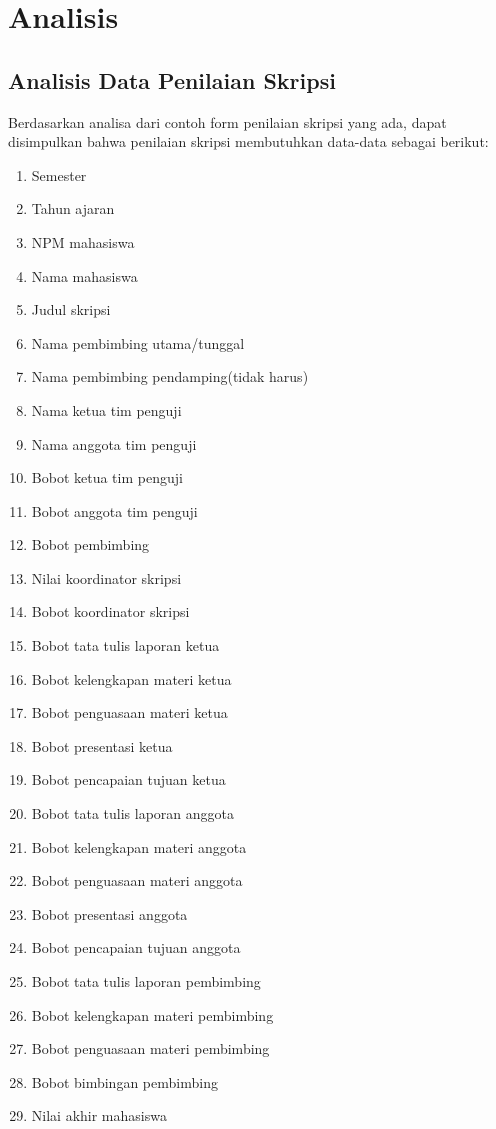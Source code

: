 \chapter{Analisis}
\label{chap: analisis}

\section{Analisis Data Penilaian Skripsi}
\label{sec: analisisData}

	Berdasarkan analisa dari contoh form penilaian skripsi yang ada, dapat disimpulkan bahwa penilaian skripsi membutuhkan data-data sebagai berikut:
		
		\begin{enumerate}
			\item Semester
			\item Tahun ajaran
			\item NPM mahasiswa 
			\item Nama mahasiswa
			\item Judul skripsi
			\item Nama pembimbing utama/tunggal
			\item Nama pembimbing pendamping(tidak harus)
			\item Nama ketua tim penguji
			\item Nama anggota tim penguji
			\item Bobot ketua tim penguji
			\item Bobot anggota tim penguji
			\item Bobot pembimbing
			\item Nilai koordinator skripsi
			\item Bobot koordinator skripsi
			\item Bobot tata tulis laporan ketua
			\item Bobot kelengkapan materi ketua
			\item Bobot penguasaan materi ketua
			\item Bobot presentasi ketua
			\item Bobot pencapaian tujuan ketua
			\item Bobot tata tulis laporan anggota
			\item Bobot kelengkapan materi anggota
			\item Bobot penguasaan materi anggota
			\item Bobot presentasi anggota
			\item Bobot pencapaian tujuan anggota
			\item Bobot tata tulis laporan pembimbing
			\item Bobot kelengkapan materi pembimbing
			\item Bobot penguasaan materi pembimbing
			\item Bobot bimbingan pembimbing
			\item Nilai akhir mahasiswa
		\end{enumerate}
	
